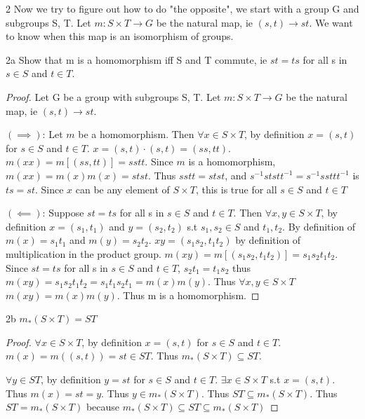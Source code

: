 \documentclass{article}
\begin{document}
\begin{PROB}{2}\label{Problem 2.}
    Now we try to figure out how to do "the opposite", we start with a group G and subgroups S, T. Let $m: S \times T \to G$ be the natural map, ie $(s,t) \to st$. We want to know when this map is an isomorphism of groups.
\end{PROB}
\begin{claim}{2a}
    Show that m is a homomorphism iff S and T commute, ie $st = ts$ for all s in $s \in S$ and $t \in T$.
\end{claim}
\begin{proof}
    Let G be a group with subgroups S, T. Let $m: S \times T \to G$ be the natural map, ie $(s,t) \to st$. 

    $(\implies)$: Let $m$ be a homomorphism. Then $\forall x \in S \times T$, by definition $x = (s, t)$ for $s \in S$ and $t \in T$. $x = (s, t) \cdot (s, t) = (ss, tt)$. $m(xx) = m[(ss, tt)] = sstt$. Since $m$ is a homomorphism, $m(xx) = m(x)m(x) = stst$. Thus $sstt = stst$, and $s^{-1}ststt^{-1} = s^{-1}ssttt^{-1}$ is $ts = st$. Since $x$ can be any element of $S \times T$, this is true for all $s \in S$ and $t \in T$

    $(\impliedby)$: Suppose $st = ts$ for all s in $s \in S$ and $t \in T$. Then $\forall x, y \in S \times T$, by definition $x = (s_1, t_1)$ and $y = (s_2, t_2)$ s.t $s_1, s_2 \in S$ and $t_1, t_2$. By definition of $m(x) = s_1t_1$ and $m(y) = s_2t_2$. $xy = (s_1s_2, t_1t_2)$ by definition of multiplication in the product group. $m(xy) = m[(s_1s_2, t_1t_2)] = s_1s_2t_1t_2$. Since $st = ts$ for all s in $s \in S$ and $t \in T$, $s_2t_1 = t_1s_2$ thus $m(xy) = s_1s_2t_1t_2 = s_1t_1s_2t_1 = m(x)m(y)$. Thus $\forall x, y \in S \times T$ $m(xy) = m(x)m(y)$. Thus m is a homomorphism.
\end{proof}


\begin{claim}{2b}
    $m_*(S \times T) = ST$
\end{claim}
\begin{proof}
    $\forall x \in S \times T$, by definition $x = (s, t)$ for $s \in S$ and $t \in T$. $m(x) = m((s, t)) = st \in ST$. Thus $m_*(S \times T) \subseteq ST$.

    $\forall y \in ST$, by definition $y = st$ for $s \in S$ and $t \in T$. $\exists x \in S \times T$ s.t $x = (s, t)$. Thus $m(x) = st = y$. Thus $y \in m_*(S \times T)$. Thus $ST \subseteq m_*(S \times T)$. Thus $ST = m_*(S \times T)$ because $m_*(S \times T) \subseteq ST \subseteq m_*(S \times T)$
\end{proof}
\end{document}
